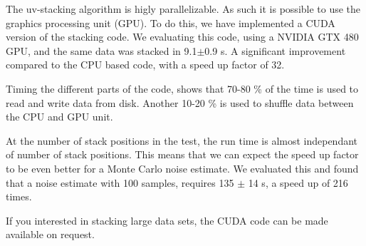 \documentclass{article}
\begin{document}
The uv-stacking algorithm is higly parallelizable. 
As such it is possible to use the graphics processing unit (GPU).
To do this, we have implemented a {CUDA \tt} version of the stacking code.
We evaluating this code,
using a NVIDIA GTX 480 GPU, 
and the same data was stacked in 9.1$\pm$0.9 s.
A significant improvement compared to the CPU based code,
with a speed up factor of 32. 

Timing the different parts of the code,
shows that 70-80 \% of the time is used to read and write data from disk.
Another 10-20 \% is used to shuffle data between the CPU and GPU unit.

At the number of stack positions in the test, 
the run time is almost independant of number of stack positions.
This means that we can expect the speed up factor to be even better for 
a Monte Carlo noise estimate.
We evaluated this and found that a noise estimate with 100 samples,
requires 135 $\pm$ 14 s, a speed up of 216 times.

If you interested in stacking large data sets, 
the CUDA code can be made available on request.

 
\end{document}

